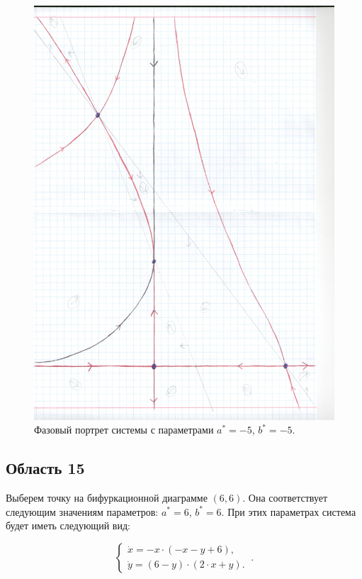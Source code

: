 \begin{figure}[h]
	
	\includegraphics[width=\textwidth]{phptr/(-5,15).jpg}
	\centering
	\caption{\label{fig:phportr14} Фазовый портрет системы с параметрами $a^\ast = -5$, $b^\ast = -5$.}
	
\end{figure}

\subsection{Область 15}

Выберем точку на бифуркационной диаграмме $(6, 6)$. Она соответствует следующим значениям параметров:  $a^\ast = 6$, $b^\ast = 6$. При этих параметрах система будет иметь следующий вид: 

$$
\left \lbrace 
\begin{matrix} 
	\dot{x} = -x \cdot (-x - y + 6), \\
	\dot{y} = (6 - y) \cdot (2 \cdot x + y). \
\end{matrix} 
\right . .$$

